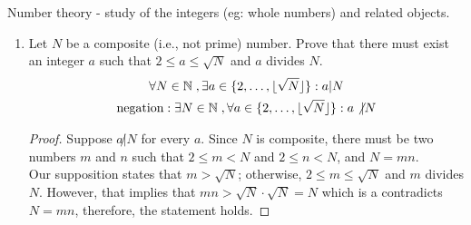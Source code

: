 \documentclass[11pt]{article}
\begin{document}

\begin{definition}
Number theory - study of the integers (eg: whole numbers) and related objects.
\end{definition}

\begin{enumerate}
    \item Let $N$ be a composite (i.e., not prime) number. Prove that there must exist an integer $a$ such that $2 \leq a \leq \sqrt{N}$ and $a$ divides $N$.
    \begin{gather}
        \forall N \in \mathbb{N}\hspace{1.0mm}, \exists a \in \{2, \ldots, \lfloor \sqrt{N} \rfloor\} : a | N \\
        \text{negation}: \exists N \in \mathbb{N}\hspace{1.0mm}, \forall a \in \{2, \ldots, \lfloor \sqrt{N} \rfloor\} : a \not | N
    \end{gather}
    \begin{proof}
        Suppose $a \not | N$ for every $a$. Since $N$ is composite, there must be two numbers $m$ and $n$ such that $2 \leq m < N$ and $2 \leq n  < N$, and $N = mn$. \\

        Our supposition states that $m > \sqrt{N}$; otherwise, $2 \leq m \leq \sqrt{N}$ and $m$ divides $N$. However, that implies that $mn > \sqrt{N} \cdot \sqrt{N} = N$ which is a contradicts $N = mn$, therefore, the statement holds. 
    \end{proof}
\end{enumerate}
\end{document}
